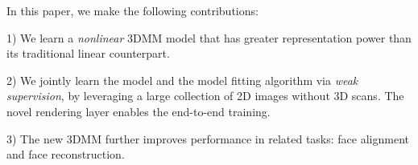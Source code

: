 In this paper, we make the following contributions:

1) We learn a \textit{nonlinear} 3DMM model that has greater representation power than its traditional linear counterpart.

2) We jointly learn the model and the model fitting algorithm via \textit{weak supervision}, by leveraging a large collection of 2D images without 3D scans. %
The novel rendering layer enables the end-to-end training.

3) The new 3DMM further improves performance in related tasks: face alignment and face reconstruction.

